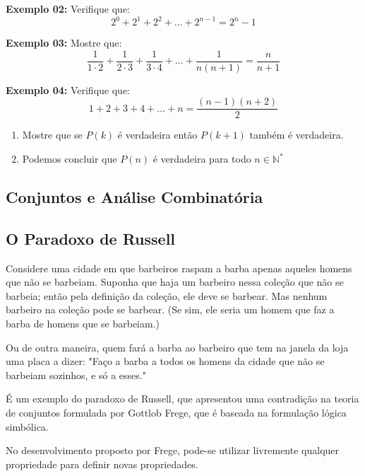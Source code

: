 \documentclass[oneside,a4paper,12pt]{article}
\begin{document}
\vspace{180pt}

{\bf Exemplo 02:} Verifique que:
$$2^{0}+2^{1}+2^{2}+\dots+2^{n-1} = 2^{n}-1$$

\vspace{180pt}

\newpage
{\bf Exemplo 03:} Mostre que:
$$\frac{1}{1 \cdot 2}+\frac{1}{2 \cdot 3} + \frac{1}{3 \cdot 4} + \dots + \frac{1}{n(n+1)} = \frac{n}{n+1}$$

\vspace{180pt}

{\bf Exemplo 04:} Verifique que:
$$1+2+3+4+\dots+n = \frac{(n-1)(n+2)}{2}$$
\begin{enumerate}
	\item Mostre que se $P(k)$ é verdadeira então $P(k+1)$ também é verdadeira.
	\item Podemos concluir que $P(n)$ é verdadeira para todo $n \in \mathbb{N}^{*}$
\end{enumerate}
\vspace{180pt}

\newpage
\begin{snugshade}
	\section{Conjuntos e Análise Combinatória}
\end{snugshade}	
	
\subsection{O Paradoxo de Russell}


Considere uma cidade em que barbeiros raspam a barba apenas aqueles homens que não se barbeiam. Suponha que haja um barbeiro nessa coleção que não se barbeia; então pela definição da coleção, ele deve se barbear. Mas nenhum barbeiro na coleção pode se barbear. (Se sim, ele seria um homem que faz a barba de homens que se barbeiam.)

Ou de outra maneira, quem fará a barba ao barbeiro que tem na janela da loja uma placa a dizer: "Faço a barba a todos os homens da cidade que não se barbeiam sozinhos, e só a esses."

É um exemplo do paradoxo de Russell, que apresentou uma contradição na teoria de conjuntos formulada por Gottlob Frege, que é baseada na formulação lógica simbólica.
	
No desenvolvimento proposto por Frege, pode-se utilizar livremente qualquer propriedade para definir novas propriedades.
	
\end{document}

